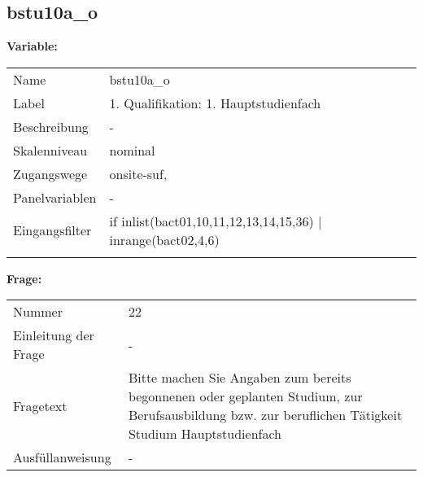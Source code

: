 	
	
	\subsection{bstu10a\_o}
	\label{subSection:bstu10a_o}

	\noindent\textbf{Variable:}\\
		\begin{tabular}{lL{11.3cm}}
			\label{tableVariable:bstu10a_o}
			Name & bstu10a\_o \\
			Label & 1. Qualifikation: 1. Hauptstudienfach \\
			Beschreibung & - \\
			Skalenniveau & nominal \\
			Zugangswege &
				onsite-suf,
 \\
			Panelvariablen & -
			 \\
			Eingangsfilter & if inlist(bact01,10,11,12,13,14,15,36) | inrange(bact02,4,6)  \\
 \\
		\end{tabular}

		\vspace*{1 cm}
		\noindent\textbf{Frage:}\\
		\begin{tabular}{lL{11.3cm}}
			\label{tableQuestion:bstu10a_o}
			Nummer & 22 \\
			Einleitung der Frage & - \\
			Fragetext & Bitte machen Sie Angaben zum bereits begonnenen oder geplanten Studium, zur Berufsausbildung bzw. zur beruflichen Tätigkeit
Studium
Hauptstudienfach \\
			Ausfüllanweisung & - \\
		\end{tabular}





